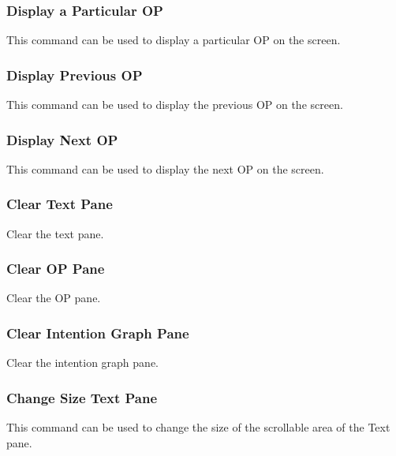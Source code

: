 \subsubsection{Display a Particular OP}

This command can be used to display a particular OP on the screen.

\subsubsection{Display Previous OP}

This command can be used to display the previous OP on the screen.

\subsubsection{Display Next OP}

This command can be used to display the next OP on the screen.

\subsubsection{Clear Text Pane}

Clear the text pane.

\subsubsection{Clear OP Pane}

Clear the OP pane.

\subsubsection{Clear Intention Graph Pane}

Clear the intention graph pane.

\subsubsection{Change Size Text Pane}

This command can be used to change the size of the scrollable area of the Text
pane.

